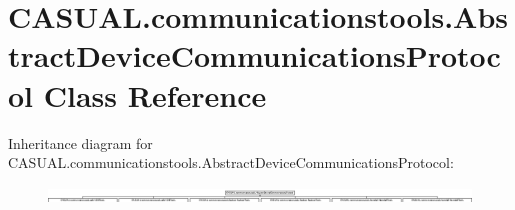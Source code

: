 \hypertarget{class_c_a_s_u_a_l_1_1communicationstools_1_1_abstract_device_communications_protocol}{\section{C\-A\-S\-U\-A\-L.\-communicationstools.\-Abstract\-Device\-Communications\-Protocol Class Reference}
\label{class_c_a_s_u_a_l_1_1communicationstools_1_1_abstract_device_communications_protocol}
}
Inheritance diagram for C\-A\-S\-U\-A\-L.\-communicationstools.\-Abstract\-Device\-Communications\-Protocol\-:\begin{figure}[H]
\begin{center}
\leavevmode
\includegraphics[height=0.446571cm]{class_c_a_s_u_a_l_1_1communicationstools_1_1_abstract_device_communications_protocol}
\end{center}
\end{figure}
